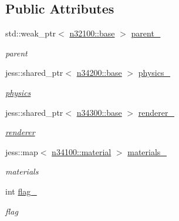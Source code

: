 \subsection*{Public Attributes}
\begin{DoxyCompactItemize}
\item 
std::weak\_\-ptr$<$ \hyperlink{classnebula_1_1content_1_1scene_1_1admin_1_1base}{n32100::base} $>$ \hyperlink{classnebula_1_1content_1_1actor_1_1admin_1_1base_a01662fd8d19fcaabbdb52047d32e4bbb}{parent\_\-}
\begin{DoxyCompactList}\small\item\em parent \item\end{DoxyCompactList}\item 
jess::shared\_\-ptr$<$ \hyperlink{classnebula_1_1content_1_1actor_1_1physics_1_1base}{n34200::base} $>$ \hyperlink{classnebula_1_1content_1_1actor_1_1admin_1_1base_a13e0d1622350f3f4ae7bec2c98825265}{physics\_\-}
\begin{DoxyCompactList}\small\item\em \hyperlink{namespacenebula_1_1content_1_1actor_1_1physics}{physics} \item\end{DoxyCompactList}\item 
jess::shared\_\-ptr$<$ \hyperlink{classnebula_1_1content_1_1actor_1_1renderer_1_1base}{n34300::base} $>$ \hyperlink{classnebula_1_1content_1_1actor_1_1admin_1_1base_a5940a5eebf157377f758715bfa26fa5a}{renderer\_\-}
\begin{DoxyCompactList}\small\item\em \hyperlink{namespacenebula_1_1content_1_1actor_1_1renderer}{renderer} \item\end{DoxyCompactList}\item 
jess::map$<$ \hyperlink{classnebula_1_1content_1_1actor_1_1admin_1_1material}{n34100::material} $>$ \hyperlink{classnebula_1_1content_1_1actor_1_1admin_1_1base_a2b681d778058ae40a0bcfc4f833c1788}{materials\_\-}
\begin{DoxyCompactList}\small\item\em materials \item\end{DoxyCompactList}\item 
int \hyperlink{classnebula_1_1content_1_1actor_1_1admin_1_1base_a1f97db269a3759147bdea9569f0ef32b}{flag\_\-}
\begin{DoxyCompactList}\small\item\em flag \item\end{DoxyCompactList}\item 

\end{DoxyCompactItemize}
